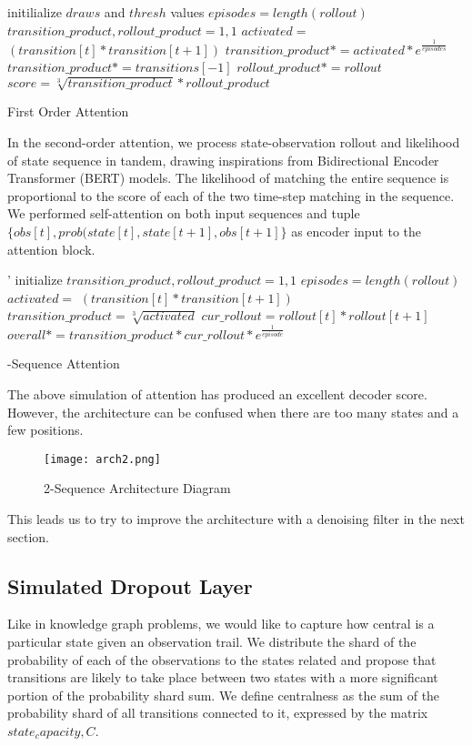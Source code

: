 \documentclass[10pt, conference, compsocconf]{IEEEtran}
\begin{document}
\begin{algorithm} [h]
initilialize $draws$ and $thresh$ values \;
$episodes = length(rollout)$ \;
$transition\_product, rollout\_product = 1, 1$ \;
{
    $activated = $  $(transition[t]*transition[t+1])$ \;
    $transition\_product *= activated * e^{\frac{1}{episodes}}$
}
$transition\_product *= transitions[-1]$ \;
{
    $rollout\_product *= rollout$ \;
}
$score = \sqrt[3]{transition\_product} * rollout\_product$ \;
\caption{{\sc First Order Attention}}
\label{algo:firstOrder}
\end{algorithm}

In the second-order attention, we process state-observation rollout and likelihood of state sequence in tandem, drawing inspirations from Bidirectional Encoder Transformer (BERT) models. The likelihood of matching the entire sequence is proportional to the score of each of the two time-step matching in the sequence. We performed self-attention on both input sequences and tuple $\{ obs[t], prob(state[t], state[t+1], obs[t+1]\}$ as encoder input to the attention block.


\begin{algorithm} [h]
'
initialize $transition\_product, rollout\_product = 1, 1$ \;
$episodes = length(rollout)$ \;
{
    $activated = $  $(transition[t]*transition[t+1])$ \;
    $transition\_product =\sqrt[3]{activated}$ \;
    $cur\_rollout = rollout[t]*rollout[t+1]$ \;
    $overall *= transition\_product*cur\_rollout*e^{\frac{1}{episode}}$ \;
}
\caption{{-Sequence Attention}}
\label{algo:secondOrder}
\end{algorithm}
The above simulation of attention has produced an excellent decoder score. However, the architecture can be confused when there are too many states and a few positions. 
\begin{figure}[h!]
  \texttt{[image: arch2.png]}
    \caption{2-Sequence Architecture Diagram}
\end{figure}
This leads us to try to improve the architecture with a denoising filter in the next section.  

\subsection{Simulated Dropout Layer}
Like in knowledge graph problems, we would like to capture how central is a particular state given an observation trail. We distribute the shard of the probability of each of the observations to the states related and propose that transitions are likely to take place between two states with a more significant portion of the probability shard sum. We define centralness as the sum of the probability shard of all transitions connected to it, expressed by the matrix $state_capacity, C$. 
\end{document}
